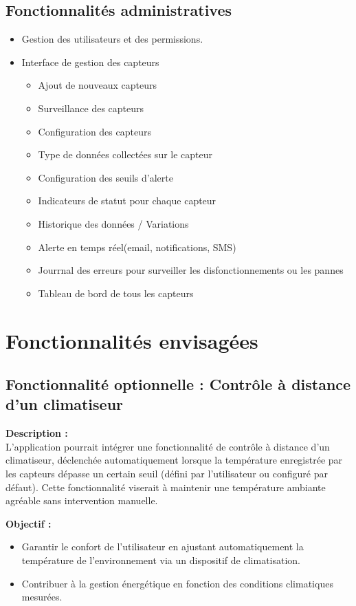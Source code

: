 \documentclass[a4paper,12pt]{article}
\begin{document}
\subsection{Fonctionnalités administratives}
\begin{itemize}
    \item Gestion des utilisateurs et des permissions.
    
    \item Interface de gestion des capteurs
    \begin{itemize}
        \item Ajout de nouveaux capteurs
        \item Surveillance des capteurs
        \item Configuration des capteurs
        \item Type de données collectées sur le capteur
	\item Configuration des seuils d'alerte
        \item Indicateurs de statut pour chaque capteur
     \item Historique des données / Variations
    \item Alerte en temps réel(email, notifications, SMS)
	\item Jourrnal des erreurs pour surveiller les disfonctionnements ou les pannes
\item Tableau de bord de tous les capteurs 
    
\end{itemize}
\end{itemize}

\section{Fonctionnalités envisagées}
\subsection{ Fonctionnalité optionnelle : Contrôle à distance d'un climatiseur}

\textbf{Description :} \\
L'application pourrait intégrer une fonctionnalité de contrôle à distance d'un climatiseur, déclenchée automatiquement lorsque la température enregistrée par les capteurs dépasse un certain seuil (défini par l'utilisateur ou configuré par défaut). Cette fonctionnalité viserait à maintenir une température ambiante agréable sans intervention manuelle.

\textbf{Objectif :} 
\begin{itemize}
    \item Garantir le confort de l'utilisateur en ajustant automatiquement la température de l'environnement via un dispositif de climatisation.
    \item Contribuer à la gestion énergétique en fonction des conditions climatiques mesurées.
\end{itemize}
\end{document}
